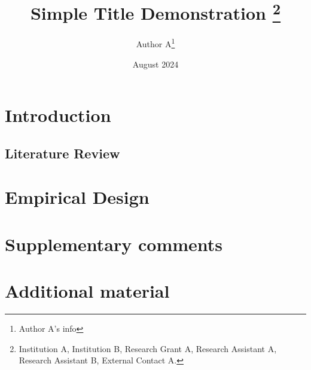 \documentclass{article}%
\title{%
Simple Title Demonstration
    \thanks{%
Institution A, Institution B, Research Grant A, Research Assistant A, Research Assistant B, External Contact A.} }
\author{Author A\thanks{Author A's info}} %
\date{August 2024}%
\begin{document}

    \maketitle%
\newpage

\section{Introduction}

\blindtext

\subsection{Literature Review}

\blindtext

\section{Empirical Design}

\blindtext

\newpage

\appendix
\appendixpage 

\section{Supplementary comments}
\blindtext

\section{Additional material}

\blindtext
\end{document}
